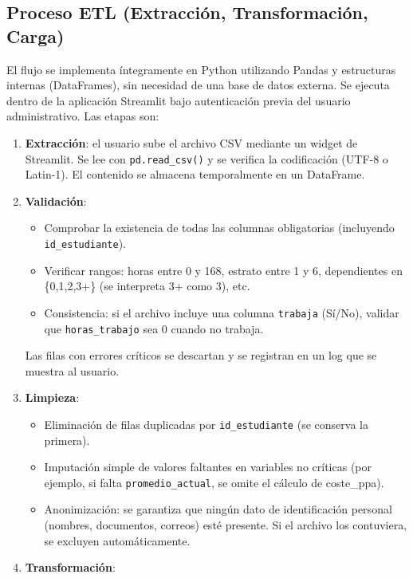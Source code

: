 \documentclass[12pt, spanish]{article}
\begin{document}
\subsection{Proceso ETL (Extracción, Transformación, Carga)}
El flujo se implementa íntegramente en Python utilizando Pandas y estructuras internas (DataFrames), sin necesidad de una base de datos externa. Se ejecuta dentro de la aplicación Streamlit bajo autenticación previa del usuario administrativo. Las etapas son:

\begin{enumerate}
    \item \textbf{Extracción}: el usuario sube el archivo CSV mediante un widget de Streamlit. Se lee con \texttt{pd.read\_csv()} y se verifica la codificación (UTF-8 o Latin-1). El contenido se almacena temporalmente en un DataFrame.
    \item \textbf{Validación}:
        \begin{itemize}
            \item Comprobar la existencia de todas las columnas obligatorias (incluyendo \texttt{id\_estudiante}).
            \item Verificar rangos: horas entre 0 y 168, estrato entre 1 y 6, dependientes en \{0,1,2,3+\} (se interpreta 3+ como 3), etc.
            \item Consistencia: si el archivo incluye una columna \texttt{trabaja} (Sí/No), validar que \texttt{horas\_trabajo} sea 0 cuando no trabaja.
        \end{itemize}
        Las filas con errores críticos se descartan y se registran en un log que se muestra al usuario.
    \item \textbf{Limpieza}:
        \begin{itemize}
            \item Eliminación de filas duplicadas por \texttt{id\_estudiante} (se conserva la primera).
            \item Imputación simple de valores faltantes en variables no críticas (por ejemplo, si falta \texttt{promedio\_actual}, se omite el cálculo de coste\_ppa).
            \item Anonimización: se garantiza que ningún dato de identificación personal (nombres, documentos, correos) esté presente. Si el archivo los contuviera, se excluyen automáticamente.
        \end{itemize}
    \item \textbf{Transformación}:
        \begin{itemize}

\end{itemize}
\end{enumerate}
\end{document}
